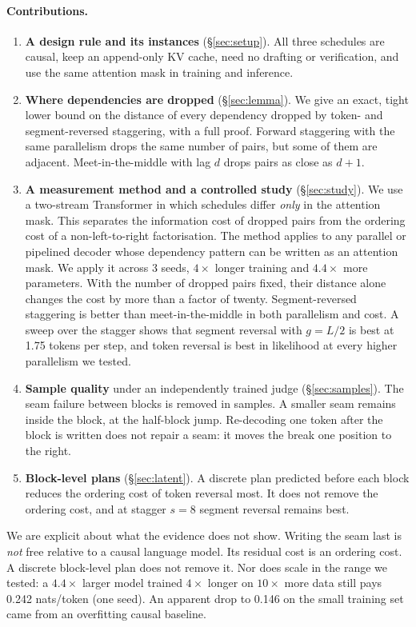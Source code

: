 \documentclass[11pt]{article}
\theoremstyle{definition}
\theoremstyle{remark}
\begin{document}
\paragraph{Contributions.}
\begin{enumerate}
  \item \textbf{A design rule and its instances} (\S\ref{sec:setup}).
  All three schedules are causal, keep an append-only KV cache, need no drafting or verification, and use the same attention mask in training and inference.
  \item \textbf{Where dependencies are dropped} (\S\ref{sec:lemma}).
  We give an exact, tight lower bound on the distance of every dependency dropped by token- and segment-reversed staggering, with a full proof.
  Forward staggering with the same parallelism drops the same number of pairs, but some of them are adjacent.
  Meet-in-the-middle with lag $d$ drops pairs as close as $d+1$.
  \item \textbf{A measurement method and a controlled study} (\S\ref{sec:study}).
  We use a two-stream Transformer in which schedules differ \emph{only} in the attention mask.
  This separates the information cost of dropped pairs from the ordering cost of a non-left-to-right factorisation.
  The method applies to any parallel or pipelined decoder whose dependency pattern can be written as an attention mask.
  We apply it across 3 seeds, $4\times$ longer training and $4.4\times$ more parameters.
  With the number of dropped pairs fixed, their distance alone changes the cost by more than a factor of twenty.
  Segment-reversed staggering is better than meet-in-the-middle in both parallelism and cost.
  A sweep over the stagger shows that segment reversal with $g=L/2$ is best at 1.75 tokens per step, and token reversal is best in likelihood at every higher parallelism we tested.
  \item \textbf{Sample quality} under an independently trained judge (\S\ref{sec:samples}).
  The seam failure between blocks is removed in samples.
  A smaller seam remains inside the block, at the half-block jump.
  Re-decoding one token after the block is written does not repair a seam: it moves the break one position to the right.
  \item \textbf{Block-level plans} (\S\ref{sec:latent}).
  A discrete plan predicted before each block reduces the ordering cost of token reversal most.
  It does not remove the ordering cost, and at stagger $s=8$ segment reversal remains best.
\end{enumerate}
We are explicit about what the evidence does not show.
Writing the seam last is \emph{not} free relative to a causal language model.
Its residual cost is an ordering cost.
A discrete block-level plan does not remove it.
Nor does scale in the range we tested: a $4.4\times$ larger model trained $4\times$ longer on $10\times$ more data still pays 0.242 nats/token (one seed).
An apparent drop to 0.146 on the small training set came from an overfitting causal baseline.
\end{document}
